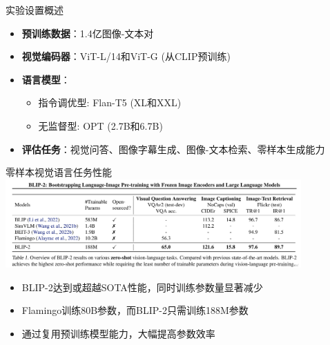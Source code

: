 \documentclass{beamer}
\begin{document}
  \begin{frame}{实验设置概述}
    \begin{itemize}
      \item \textbf{预训练数据}：1.4亿图像-文本对
      \item \textbf{视觉编码器}：ViT-L/14和ViT-G (从CLIP预训练)
      \item \textbf{语言模型}：
        \begin{itemize}
          \item 指令调优型: Flan-T5 (XL和XXL)
          \item 无监督型: OPT (2.7B和6.7B)
        \end{itemize}
      \item \textbf{评估任务}：视觉问答、图像字幕生成、图像-文本检索、零样本生成能力
    \end{itemize}
  \end{frame}
  
  \begin{frame}{零样本视觉语言任务性能}
    \centering
    \includegraphics[width=0.85\textwidth]{table1.png}
    \vspace{0.2cm}
    
    \begin{itemize}
      \item BLIP-2达到或超越SOTA性能，同时训练参数量显著减少
      \item Flamingo训练80B参数，而BLIP-2只需训练188M参数
      \item 通过复用预训练模型能力，大幅提高参数效率
    \end{itemize}
  \end{frame}
  
\end{document}
